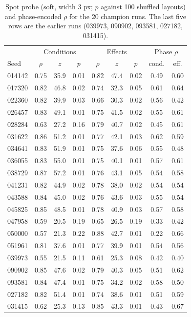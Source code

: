 \documentclass[11pt,a4paper]{article}
\begin{document}
\begin{table}[h]
\centering\footnotesize
\setlength{\tabcolsep}{4pt}
\begin{tabular}{@{}lcccccc|cc@{}}
\toprule
 & \multicolumn{3}{c}{Conditions} & \multicolumn{3}{c|}{Effects} & \multicolumn{2}{c}{Phase $\rho$} \\
Seed & $\rho$ & $z$ & $p$ & $\rho$ & $z$ & $p$ & cond. & eff. \\
\midrule
014142 & 0.75 & 35.9 & 0.01 & 0.82 & 47.4 & 0.02 & 0.49 & 0.60 \\
017320 & 0.82 & 46.8 & 0.02 & 0.74 & 32.3 & 0.05 & 0.61 & 0.64 \\
022360 & 0.82 & 39.9 & 0.03 & 0.66 & 30.3 & 0.02 & 0.56 & 0.42 \\
026457 & 0.83 & 49.1 & 0.01 & 0.75 & 41.5 & 0.02 & 0.55 & 0.61 \\
028284 & 0.63 & 27.2 & 0.16 & 0.79 & 40.7 & 0.02 & 0.45 & 0.61 \\
031622 & 0.86 & 51.2 & 0.01 & 0.77 & 42.1 & 0.03 & 0.62 & 0.59 \\
034641 & 0.83 & 51.9 & 0.01 & 0.75 & 37.6 & 0.06 & 0.55 & 0.48 \\
036055 & 0.83 & 55.0 & 0.01 & 0.75 & 40.1 & 0.01 & 0.57 & 0.61 \\
038729 & 0.87 & 57.2 & 0.01 & 0.76 & 43.1 & 0.05 & 0.54 & 0.58 \\
041231 & 0.82 & 44.9 & 0.02 & 0.78 & 38.0 & 0.02 & 0.54 & 0.54 \\
043588 & 0.84 & 45.0 & 0.02 & 0.76 & 43.6 & 0.03 & 0.55 & 0.54 \\
045825 & 0.85 & 48.5 & 0.01 & 0.78 & 40.9 & 0.03 & 0.57 & 0.58 \\
047958 & 0.59 & 20.5 & 0.19 & 0.65 & 26.5 & 0.19 & 0.33 & 0.42 \\
050000 & 0.57 & 21.3 & 0.22 & 0.88 & 42.7 & 0.01 & 0.22 & 0.66 \\
051961 & 0.81 & 37.6 & 0.01 & 0.77 & 39.9 & 0.01 & 0.54 & 0.56 \\
039973 & 0.55 & 21.5 & 0.11 & 0.61 & 25.3 & 0.08 & 0.42 & 0.40 \\
090902 & 0.85 & 47.6 & 0.02 & 0.79 & 40.3 & 0.05 & 0.51 & 0.62 \\
093581 & 0.84 & 47.4 & 0.01 & 0.75 & 34.2 & 0.02 & 0.58 & 0.50 \\
027182 & 0.82 & 51.4 & 0.01 & 0.74 & 38.6 & 0.01 & 0.51 & 0.59 \\
031415 & 0.62 & 25.3 & 0.13 & 0.85 & 43.3 & 0.01 & 0.43 & 0.67 \\
\bottomrule
\end{tabular}
\caption{Spot probe (soft, width 3 px; $p$ against 100 shuffled layouts) and
phase-encoded $\rho$ for the 20 champion runs. The last five rows are the earlier
runs (039973, 090902, 093581, 027182, 031415).}
\label{tab:champion}
\end{table}
\end{document}
